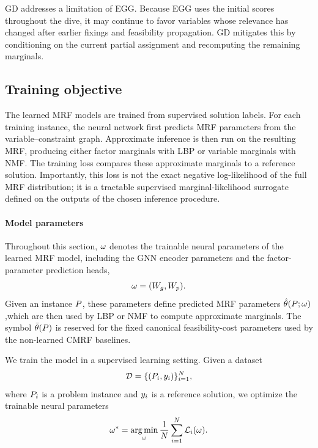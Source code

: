 GD addresses a limitation of EGG. Because EGG uses the initial scores throughout the dive, it may continue to favor variables whose relevance has changed after earlier fixings and feasibility propagation. GD mitigates this by conditioning on the current partial assignment and recomputing the remaining marginals.

\subsection{Training objective}
\label{sec:chapter_3_training_objective}

The learned MRF models are trained from supervised solution labels. For each training instance, the neural network first predicts MRF parameters from the variable--constraint graph. Approximate inference is then run on the resulting MRF, producing either factor marginals with LBP or variable marginals with NMF. The training loss compares these approximate marginals to a reference solution. Importantly, this loss is not the exact negative log-likelihood of the full MRF
distribution; it is a tractable supervised marginal-likelihood surrogate defined on the outputs of the chosen inference procedure.

\paragraph{Model parameters} 
Throughout this section, $\omega$ denotes the trainable neural parameters of the learned MRF model, including the GNN encoder parameters and the factor-parameter prediction heads,
\begin{equation*}
    \omega = (W_g, W_p).
\end{equation*}
Given an instance $P$, these parameters define predicted MRF parameters $\hat{\theta}(P;\omega)$,which are then used by LBP or NMF to compute approximate marginals. The symbol $\bar{\theta}(P)$ is reserved for the fixed canonical feasibility-cost parameters used by the non-learned CMRF baselines.

We train the model in a supervised learning setting. Given a dataset
\begin{equation*}
    \mathcal{D} = \{(P_i,y_i)\}_{i=1}^{N},
\end{equation*}
where $P_i$ is a problem instance and $y_i$ is a reference solution, we optimize the trainable neural parameters
\begin{equation}
    \omega^*
    =
    \operatorname*{arg\,min}_{\omega}
    \frac{1}{N}
    \sum_{i=1}^{N}
    \mathcal{L}_i(\omega).
\end{equation}

